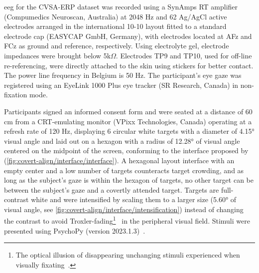 \ac{eeg} for the CVSA-ERP dataset was recorded using a SynAmps RT amplifier
(Compumedics Neuroscan, Australia) at 2048 Hz and 62 Ag/AgCl active electrodes arranged in the
international 10-10 layout fitted to a standard electrode cap (EASYCAP GmbH,
Germany), with electrodes located at AFz and FCz as ground and reference, respectively.
Using electrolyte gel, electrode impedances were brought below 5k$\Omega$.
Electrodes TP9 and TP10, used for off-line re-referencing, were directly
attached to the skin using stickers for better contact.
The power line frequency in Belgium is 50 Hz.
The participant's eye gaze was registered using an EyeLink 1000 Plus eye tracker (SR Research,
Canada) in non-fixation mode.

Participants signed an informed consent form and were seated at a distance of
60 cm from a CRT-emulating monitor (VPixx
Technologies, Canada) operating at a refresh rate of 120 Hz, displaying 6
circular white targets with a diameter of 4.15° visual angle and laid out on a hexagon
with a radius of 12.28° of visual angle centered on the midpoint of the screen,
conforming to the interface proposed by \textcite{Treder2010}
(\cref{fig:covert-align/interface/interface}).
A hexagonal layout interface with an empty center and a low number of targets
counteracts target crowding, and as long as the subject’s gaze is within the hexagon of
targets, no other target can be between the subject’s gaze and a covertly
attended target.
Targets are full-contrast white and were intensified by scaling them to a
larger size (5.60° of visual angle, see \cref{fig:covert-align/interface/intensification})
instead of changing the contrast to avoid Troxler-fading\footnote{The optical illusion of disappearing unchanging stimuli
experienced when visually fixating~\cite{Troxler1804}.}~\cite{Treder2010} in the
peripheral visual field.
Stimuli were presented using PsychoPy (version 2023.1.3)~\cite{Peirce2019}.

